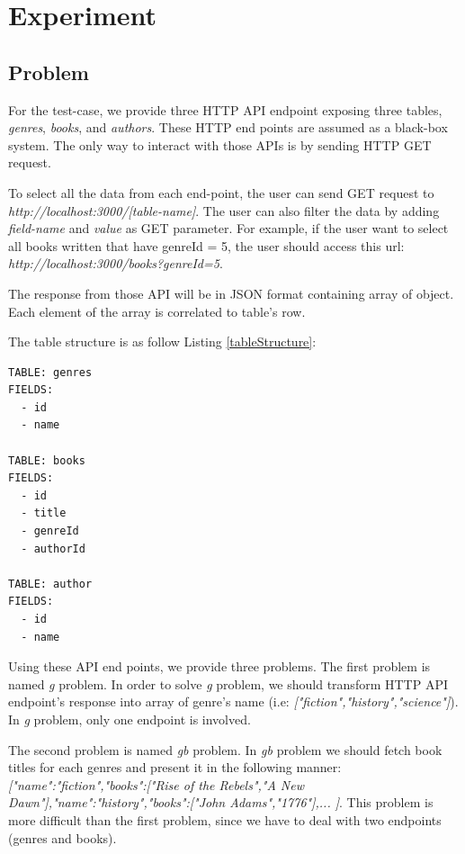 \documentclass[conference]{IEEEtran}
\begin{document}
\section{Experiment}

\subsection{Problem}

For the test-case, we provide three HTTP API endpoint exposing three tables, {\it genres}, {\it books}, and {\it authors}. These HTTP end points are assumed as a black-box system. The only way to interact with those APIs is by sending HTTP GET request.

To select all the data from each end-point, the user can send GET request to {\it http://localhost:3000/[table-name]}. The user can also filter the data by adding {\it field-name} and {\it value} as GET parameter. For example, if the user want to select all books written that have genreId = 5, the user should access this url: {\it http://localhost:3000/books?genreId=5}.

The response from those API will be in JSON format containing array of object. Each element of the array is correlated to table's row.

The table structure is as follow Listing \ref{tableStructure}:

\begin{lstlisting}[caption=Table Structure, label=tableStructure, basicstyle=\footnotesize, breaklines=true]
TABLE: genres
FIELDS:
  - id
  - name

TABLE: books
FIELDS:
  - id
  - title
  - genreId
  - authorId

TABLE: author
FIELDS:
  - id
  - name
\end{lstlisting}

Using these API end points, we provide three problems. The first problem is named {\it g} problem. In order to solve {\it g} problem, we should transform HTTP API endpoint's response into array of genre's name (i.e: {\it ["fiction","history","science"]}). In {\it g} problem, only one endpoint is involved.

The second problem is named {\it gb } problem. In {\it gb } problem we should fetch book titles for each genres and present it in the following manner: {\it [{"name":"fiction","books":["Rise of the Rebels","A New Dawn"]},{"name":"history","books":["John Adams","1776"]},... ]}. This problem is more difficult than the first problem, since we have to deal with two endpoints (genres and books).
\end{document}
